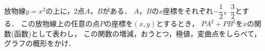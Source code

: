 \documentclass[../../main.tex]{subfiles}
\begin{document}
放物線$y=x^2$の上に，2点$A$，$B$がある．
$A$，$B$の$x$座標をそれぞれ$\displaystyle -\dfrac{1}{2}$，$\displaystyle\dfrac{3}{2}$とする．
この放物線上の任意の点$P$の座標を$(x,y)$とするとき，
${PA}^2+{PB}^2$を$x$の関数(函数)として表わし，
この関数の増減，おうとつ，極値，変曲点をしらべて，グラフの概形をかけ．
\end{document}
